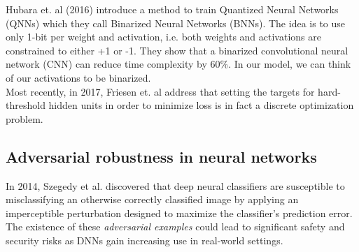 Hubara et. al (2016) introduce a method to train Quantized Neural Networks (QNNs) which they call Binarized Neural Networks (BNNs). The idea is to use only 1-bit per weight and activation, i.e. both weights and activations are constrained to either +1 or -1. They show that a binarized convolutional neural network (CNN) can reduce time complexity by 60\%. In our model, we can think of our activations to be binarized.\\ 

Most recently, in 2017, Friesen et. al address that setting the targets for hard-threshold hidden units in order to minimize loss is in fact a discrete optimization problem. 

\subsection{Adversarial robustness in neural networks}

In 2014, Szegedy et al. discovered that deep neural classifiers are susceptible to misclassifying an otherwise correctly classified image by applying an imperceptible perturbation designed to maximize the classifier's prediction error. The existence of these \textit{adversarial examples} could lead to significant safety and security risks as DNNs gain increasing use in real-world settings. 